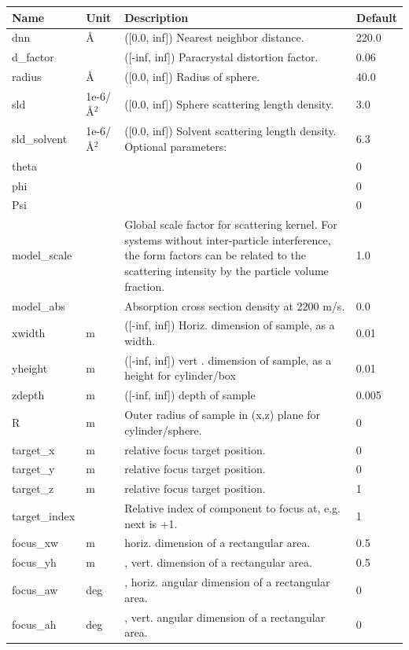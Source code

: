\begin{longtable}{p{}p{}p{}p{}}
\toprule
\textbf{Name} & \textbf{Unit} & \textbf{Description} & \textbf{Default} \\
\midrule
\endhead
dnn & \AA{} & ([0.0, inf]) Nearest neighbor distance. & 220.0 \\
d\_factor &  & ([-inf, inf]) Paracrystal distortion factor. & 0.06 \\
radius & \AA{} & ([0.0, inf]) Radius of sphere. & 40.0 \\
sld & 1e-6/\AA{}$^{2}$ & ([0.0, inf]) Sphere scattering length density. & 3.0 \\
sld\_solvent & 1e-6/\AA{}$^{2}$ & ([0.0, inf]) Solvent scattering length density. Optional parameters: & 6.3 \\
theta &  &  & 0 \\
phi &  &  & 0 \\
Psi &  &  & 0 \\
model\_scale &   & Global scale factor for scattering kernel. For systems without inter-particle interference, the form factors can be related to the scattering intensity by the particle volume fraction. & 1.0 \\
model\_abs &   & Absorption cross section density at 2200 m/s. & 0.0 \\
xwidth & m & ([-inf, inf]) Horiz. dimension of sample, as a width. & 0.01 \\
yheight & m & ([-inf, inf]) vert . dimension of sample, as a height for cylinder/box & 0.01 \\
zdepth & m & ([-inf, inf]) depth of sample & 0.005 \\
R & m & Outer radius of sample in (x,z) plane for cylinder/sphere. & 0 \\
target\_x & m & relative focus target position. & 0 \\
target\_y & m & relative focus target position. & 0 \\
target\_z & m & relative focus target position. & 1 \\
target\_index &   & Relative index of component to focus at, e.g. next is +1. & 1 \\
focus\_xw & m & horiz. dimension of a rectangular area. & 0.5 \\
focus\_yh & m & , vert. dimension of a rectangular area. & 0.5 \\
focus\_aw & deg & , horiz. angular dimension of a rectangular area. & 0 \\
focus\_ah & deg & , vert. angular dimension of a rectangular area. & 0 \\

\end{longtable}
